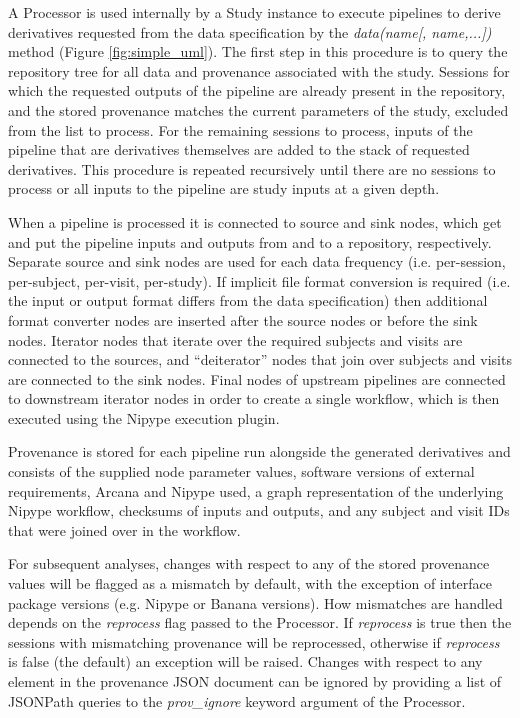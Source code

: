 \documentclass[smallextended]{svjour3}       %
\begin{document}
A Processor is used internally by a Study instance to execute pipelines
to derive derivatives requested from the data specification by the
\emph{data(name{[}, name,...{]})} method (Figure \ref{fig:simple_uml}). The first
step in this procedure is to query the repository tree for all data and
provenance associated with the study. Sessions for which the requested
outputs of the pipeline are already present in the repository, and the stored
provenance matches the current parameters of the study,
excluded from the list to process. For the remaining sessions to
process, inputs of the pipeline that are derivatives themselves are
added to the stack of requested derivatives. This procedure is repeated
recursively until there are no sessions to process or all inputs to the
pipeline are study inputs at a given depth.

When a pipeline is processed it is connected to source and
sink nodes, which get and put the pipeline inputs and outputs
from and to a repository, respectively. Separate source and sink nodes
are used for each data frequency (i.e. per-session, per-subject,
per-visit, per-study). If implicit file format conversion is required
(i.e. the input or output format differs from the data specification)
then additional format converter nodes are inserted after the source
nodes or before the sink nodes. Iterator nodes that iterate over the
required subjects and visits are connected to the sources, and ``deiterator''
nodes that join over subjects and visits are connected to the sink
nodes. Final nodes of upstream pipelines are connected to downstream
iterator nodes in order to create a single workflow, which is then executed using
the Nipype execution plugin.

Provenance is stored for each pipeline run alongside the generated
derivatives and consists of the supplied node parameter values,
software versions of external requirements, Arcana and Nipype used, 
a graph representation of the underlying Nipype workflow, checksums of inputs
and outputs, and any subject and visit IDs that were joined over in the workflow.

For subsequent analyses, changes with respect to any of the stored provenance values will
be flagged as a mismatch by default, with the exception of interface package versions
(e.g. Nipype or Banana versions). How mismatches are handled depends on the \emph{reprocess} flag passed to the
Processor. If \emph{reprocess} is true then the sessions with mismatching provenance
will be reprocessed, otherwise if \emph{reprocess} is false (the default) an exception will be raised.
Changes with respect to any element in the provenance JSON document can be ignored by providing
a list of JSONPath queries to the \emph{prov\_ignore} keyword argument of the Processor.
\end{document}

